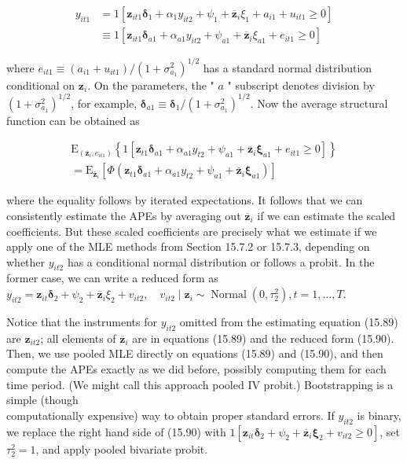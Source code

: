\documentclass[10pt]{article}
\begin{document}
\begin{align*}
y_{i t 1} & =1\left[\mathbf{z}_{i t 1} \boldsymbol{\delta}_{1}+\alpha_{1} y_{i t 2}+\psi_{1}+\overline{\mathbf{z}}_{i} \xi_{1}+a_{i 1}+u_{i t 1} \geq 0\right] \\
& \equiv 1\left[\mathbf{z}_{i t 1} \boldsymbol{\delta}_{a 1}+\alpha_{a 1} y_{i t 2}+\psi_{a 1}+\overline{\mathbf{z}}_{i} \xi_{a 1}+e_{i t 1} \geq 0\right] \tag{15.89}
\end{align*}


where $e_{i t 1} \equiv\left(a_{i 1}+u_{i t 1}\right) /\left(1+\sigma_{a_{1}}^{2}\right)^{1 / 2}$ has a standard normal distribution conditional on $\mathbf{z}_{i}$. On the parameters, the " $a$ " subscript denotes division by $\left(1+\sigma_{a_{1}}^{2}\right)^{1 / 2}$, for example, $\boldsymbol{\delta}_{a 1} \equiv \boldsymbol{\delta}_{1} /\left(1+\sigma_{a_{1}}^{2}\right)^{1 / 2}$. Now the average structural function can be obtained as

$$
\begin{gathered}
\mathrm{E}_{\left(\overline{\mathbf{z}}_{i}, e_{i t 1}\right)}\left\{1\left[\mathbf{z}_{t 1} \boldsymbol{\delta}_{a 1}+\alpha_{a 1} y_{t 2}+\psi_{a 1}+\overline{\mathbf{z}}_{i} \boldsymbol{\xi}_{a 1}+e_{i t 1} \geq 0\right]\right\} \\
=\mathrm{E}_{\overline{\mathbf{z}}_{i}}\left[\Phi\left(\mathbf{z}_{t 1} \boldsymbol{\delta}_{a 1}+\alpha_{a 1} y_{t 2}+\psi_{a 1}+\overline{\mathbf{z}}_{i} \boldsymbol{\xi}_{a 1}\right)\right]
\end{gathered}
$$

where the equality follows by iterated expectations. It follows that we can consistently estimate the APEs by averaging out $\overline{\mathbf{z}}_{i}$ if we can estimate the scaled coefficients. But these scaled coefficients are precisely what we estimate if we apply one of the MLE methods from Section 15.7.2 or 15.7.3, depending on whether $y_{i t 2}$ has a conditional normal distribution or follows a probit. In the former case, we can write a reduced form as\\
$y_{i t 2}=\mathbf{z}_{i t} \boldsymbol{\delta}_{2}+\psi_{2}+\overline{\mathbf{z}}_{i} \xi_{2}+v_{i t 2}, \quad v_{i t 2} \mid \mathbf{z}_{i} \sim \operatorname{Normal}\left(0, \tau_{2}^{2}\right), t=1, \ldots, T$.

Notice that the instruments for $y_{i t 2}$ omitted from the estimating equation (15.89) are $\mathbf{z}_{i t 2}$; all elements of $\overline{\mathbf{z}}_{i}$ are in equations (15.89) and the reduced form (15.90). Then, we use pooled MLE directly on equations (15.89) and (15.90), and then compute the APEs exactly as we did before, possibly computing them for each time period. (We might call this approach pooled IV probit.) Bootstrapping is a simple (though\\
computationally expensive) way to obtain proper standard errors. If $y_{i t 2}$ is binary, we replace the right hand side of (15.90) with $1\left[\mathbf{z}_{i t} \boldsymbol{\delta}_{2}+\psi_{2}+\overline{\mathbf{z}}_{i} \boldsymbol{\xi}_{2}+v_{i t 2} \geq 0\right]$, set $\tau_{2}^{2}=1$, and apply pooled bivariate probit.
\end{document}
